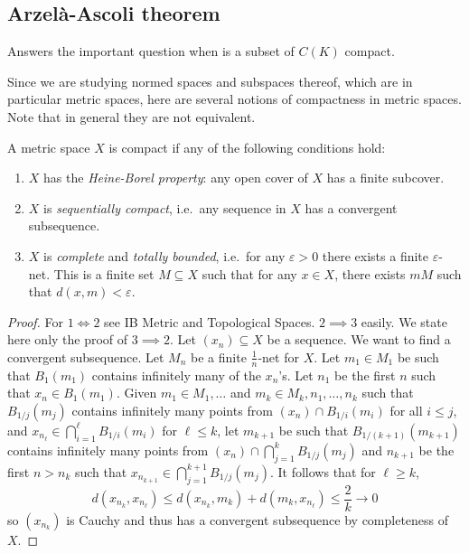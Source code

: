 \documentclass[a4paper]{article}
\begin{document}
\subsection{Arzelà-Ascoli theorem}

Answers the important question when is a subset of \(C(K)\) compact.

Since we are studying normed spaces and subspaces thereof, which are in particular metric spaces, here are several notions of compactness in metric spaces. Note that in general they are not equivalent.

\begin{definition}
  A metric space \(X\) is compact if any of the following conditions hold:
  \begin{enumerate}
  \item \(X\) has the \emph{Heine-Borel property}: any open cover of \(X\) has a finite subcover.
  \item \(X\) is \emph{sequentially compact}, i.e.\ any sequence in \(X\) has a convergent subsequence.
  \item \(X\) is \emph{complete} and \emph{totally bounded}, i.e.\ for any \(\varepsilon > 0\) there exists a finite \(\varepsilon\)-net. This is a finite set \(M \subseteq X\) such that for any \(x \in X\), there exists \(m M\) such that \(d(x, m) < \varepsilon\).
  \end{enumerate}
\end{definition}

\begin{proof}
  For \(1 \iff 2\) see IB Metric and Topological Spaces. \(2 \implies 3\) easily. We state here only the proof of \(3 \implies 2\). Let \((x_n) \subseteq X\) be a sequence. We want to find a convergent subsequence. Let \(M_n\) be a finite \(\frac{1}{n}\)-net for \(X\). Let \(m_1 \in M_1\) be such that \(B_1(m_1)\) contains infinitely many of the \(x_n\)'s. Let \(n_1\) be the first \(n\) such that \(x_n \in B_1(m_1)\). Given \(m_1 \in M_1, \dots\) and \(m_k \in M_k, n_1, \dots, n_k\) such that \(B_{1/j}(m_j)\) contains infinitely many points from \((x_n) \cap B_{1/i}(m_i)\) for all \(i \leq j\), and \(x_{n_\ell} \in \bigcap_{i = 1}^\ell B_{1/i}(m_i)\) for \(\ell \leq k\), let \(m_{k + 1}\) be such that \(B_{1/(k + 1)}(m_{k + 1})\) contains infinitely many points from \((x_n) \cap \bigcap_{j = 1}^k B_{1/j}(m_j)\) and \(n_{k + 1}\) be the first \(n > n_k\) such that \(x_{n_{k + 1}} \in \bigcap_{j = 1}^{k + 1} B_{1/j}(m_j)\). It follows that for \(\ell \geq k\),
  \[
    d(x_{n_k}, x_{n_\ell}) \leq d(x_{n_k}, m_k) + d(m_k, x_{n_\ell}) \leq \frac{2}{k} \to 0
  \]
  so \((x_{n_k})\) is Cauchy and thus has a convergent subsequence by completeness of \(X\).
\end{proof}
\end{document}
